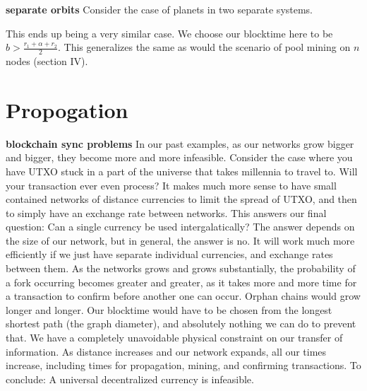 \documentclass[conference]{IEEEtran}
\begin{document}
\textbf{separate orbits}
Consider the case of planets in two separate systems.
\begin{center}
\end{center}

This ends up being a very similar case. We choose our blocktime here to be $b > \frac{r_1 + \alpha + r_2}{2}$. This generalizes the same as would the scenario of pool mining on $n$ nodes (section IV).

\section{Propogation}


\textbf{blockchain sync problems}
In our past examples, as our networks grow bigger and bigger, they become more and more infeasible. Consider the case where you have UTXO stuck in a part of the universe that takes millennia to travel to. Will your transaction ever even process? It makes much more sense to have small contained networks of distance currencies to limit the spread of UTXO, and then to simply have an exchange rate between networks. This answers our final question: Can a single currency be used intergalatically? The answer depends on the size of our network, but in general, the answer is no. It will work much more efficiently if we just have separate individual currencies, and exchange rates between them.
As the networks grows and grows substantially, the probability of a fork occurring becomes greater and greater, as it takes more and more time for a transaction to confirm before another one can occur. Orphan chains would grow longer and longer. Our blocktime would have to be chosen from the longest shortest path (the graph diameter), and  absolutely nothing we can do to prevent that. We have a completely unavoidable physical constraint on our transfer of information. As distance increases and our network expands, all our times increase, including times for propagation, mining, and confirming transactions. To conclude: A universal decentralized currency is infeasible. 
\end{document}
